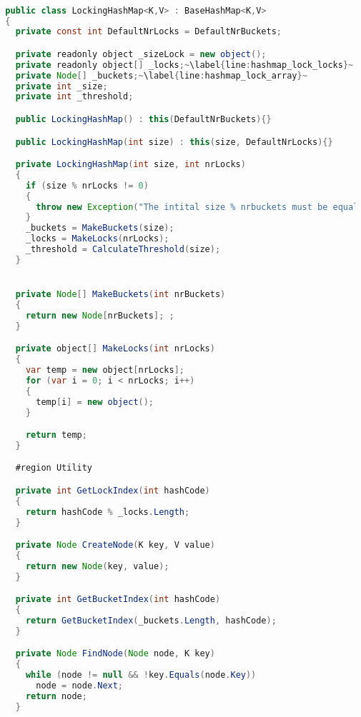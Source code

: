 \begin{lstlisting}[label=lst:impl_hashmap_lock,
  caption={Lock based Concurrent Hasmap Implementation},
  language=Java,  
  showspaces=false,
  showtabs=false,
  breaklines=true,
  showstringspaces=false,
  breakatwhitespace=true,
  commentstyle=\color{greencomments},
  keywordstyle=\color{bluekeywords},
  stringstyle=\color{redstrings},
  escapechar=~,
  morekeywords={atomic, retry, orelse, var, get, set, ref, out, readonly, virtual, override, region, endregion, foreach, lock}]  % Start your code-block

  public class LockingHashMap<K,V> : BaseHashMap<K,V>
  {
    private const int DefaultNrLocks = DefaultNrBuckets;

    private readonly object _sizeLock = new object();
    private readonly object[] _locks;~\label{line:hashmap_lock_locks}~
    private Node[] _buckets;~\label{line:hashmap_lock_array}~
    private int _size;
    private int _threshold;

    public LockingHashMap() : this(DefaultNrBuckets){}

    public LockingHashMap(int size) : this(size, DefaultNrLocks){}

    private LockingHashMap(int size, int nrLocks)
    {
      if (size % nrLocks != 0)
      {
        throw new Exception("The intital size % nrbuckets must be equal to zero");
      }
      _buckets = MakeBuckets(size);
      _locks = MakeLocks(nrLocks);
      _threshold = CalculateThreshold(size);
    }


    private Node[] MakeBuckets(int nrBuckets)
    {
      return new Node[nrBuckets]; ;
    }

    private object[] MakeLocks(int nrLocks)
    {
      var temp = new object[nrLocks];
      for (var i = 0; i < nrLocks; i++)
      {
        temp[i] = new object();
      }

      return temp;
    }

    #region Utility

    private int GetLockIndex(int hashCode)
    {
      return hashCode % _locks.Length;
    }

    private Node CreateNode(K key, V value)
    {
      return new Node(key, value);
    }

    private int GetBucketIndex(int hashCode)
    {
      return GetBucketIndex(_buckets.Length, hashCode);
    }

    private Node FindNode(Node node, K key)
    {
      while (node != null && !key.Equals(node.Key))
        node = node.Next;
      return node;
    }


\end{lstlisting}
